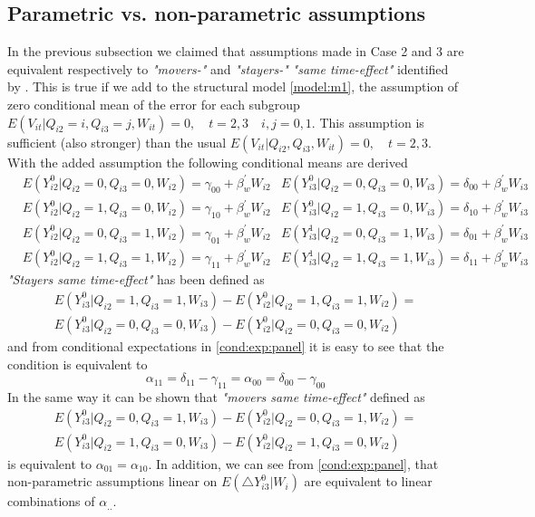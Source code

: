 \documentclass[12pt]{article}
\begin{document}
\subsection{Parametric vs. non-parametric assumptions} \label{comp:assumptions}
In the previous subsection we claimed that assumptions made in Case 2 and 3 are equivalent respectively to \textit{"movers-"} and \textit{"stayers-"} \textit{"same time-effect"} identified by \cite{lee2014difference}. This is true if we add to the structural model \ref{model:m1}, the assumption of zero conditional mean of the error for each subgroup $E(V_{it}|Q_{i2}=i,Q_{i3}=j,W_{it})=0, \quad t=2,3 \quad i,j=0,1$. This assumption is sufficient (also stronger) than the usual $E(V_{it}|Q_{i2},Q_{i3},W_{it})=0, \quad t=2,3$. With the added assumption the following conditional means are derived
\begin{align*}\label{cond:exp:panel}
&E(Y_{i2}^0|Q_{i2}=0,Q_{i3}=0,W_{i2})=\gamma_{00}+\beta_w^\prime W_{i2} & E(Y_{i3}^0|Q_{i2}=0,Q_{i3}=0,W_{i3})=\delta_{00}+\beta_w^\prime W_{i3} \\
&E(Y_{i2}^0|Q_{i2}=1,Q_{i3}=0,W_{i2})=\gamma_{10}+\beta_w^\prime W_{i2} & E(Y_{i3}^0|Q_{i2}=1,Q_{i3}=0,W_{i3})=\delta_{10}+\beta_w^\prime W_{i3}\\
&E(Y_{i2}^0|Q_{i2}=0,Q_{i3}=1,W_{i2})=\gamma_{01}+\beta_w^\prime W_{i2} & E(Y_{i3}^1|Q_{i2}=0,Q_{i3}=1,W_{i3})=\delta_{01}+\beta_w^\prime W_{i3}\\
&E(Y_{i2}^0|Q_{i2}=1,Q_{i3}=1,W_{i2})=\gamma_{11}+\beta_w^\prime W_{i2} & E(Y_{i3}^1|Q_{i2}=1,Q_{i3}=1,W_{i3})=\delta_{11}+\beta_w^\prime W_{i3} \tag{$CE_1$}
\end{align*}
\textit{"Stayers same time-effect"} has been defined as
\begin{multline*}
E(Y_{i3}^0|Q_{i2}=1,Q_{i3}=1,W_{i3})-E(Y_{i2}^0|Q_{i2}=1,Q_{i3}=1,W_{i2})=\\
E(Y_{i3}^0|Q_{i2}=0,Q_{i3}=0,W_{i3})-E(Y_{i2}^0|Q_{i2}=0,Q_{i3}=0,W_{i2})
\end{multline*}
and from conditional expectations in \ref{cond:exp:panel} it is easy to see that the condition is equivalent to
$$ \alpha_{11} = \delta_{11} - \gamma_{11} = \alpha_{00} = \delta_{00} - \gamma_{00} $$
In the same way it can be shown that \textit{"movers same time-effect"} defined as
\begin{multline*}
E(Y_{i3}^0|Q_{i2}=0,Q_{i3}=1,W_{i3})-E(Y_{i2}^0|Q_{i2}=0,Q_{i3}=1,W_{i2})=\\
E(Y_{i3}^0|Q_{i2}=1,Q_{i3}=0,W_{i3})-E(Y_{i2}^0|Q_{i2}=1,Q_{i3}=0,W_{i2})
\end{multline*}
is equivalent to $\alpha_{01}=\alpha_{10}$. In addition, we can see from \ref{cond:exp:panel}, that non-parametric assumptions linear on $E(\triangle Y_{i3}^0|W_i)$ are equivalent to linear combinations of $\alpha_{..}$. 
\end{document}
